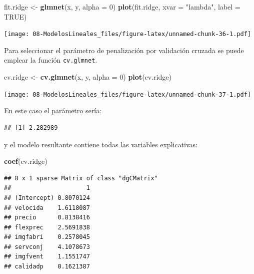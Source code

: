 \documentclass[]{book}
\newenvironment{Shaded}{\begin{snugshade}}{\end{snugshade}}
\newcommand{\KeywordTok}[1]{\textcolor[rgb]{0.13,0.29,0.53}{\textbf{#1}}}
\newcommand{\DataTypeTok}[1]{\textcolor[rgb]{0.13,0.29,0.53}{#1}}
\newcommand{\DecValTok}[1]{\textcolor[rgb]{0.00,0.00,0.81}{#1}}
\newcommand{\StringTok}[1]{\textcolor[rgb]{0.31,0.60,0.02}{#1}}
\newcommand{\OtherTok}[1]{\textcolor[rgb]{0.56,0.35,0.01}{#1}}
\newcommand{\OperatorTok}[1]{\textcolor[rgb]{0.81,0.36,0.00}{\textbf{#1}}}
\newcommand{\NormalTok}[1]{#1}
\begin{document}
\begin{Shaded}
\begin{Highlighting}[]
\NormalTok{fit.ridge <-}\StringTok{ }\KeywordTok{glmnet}\NormalTok{(x, y, }\DataTypeTok{alpha =} \DecValTok{0}\NormalTok{)}
\KeywordTok{plot}\NormalTok{(fit.ridge, }\DataTypeTok{xvar =} \StringTok{"lambda"}\NormalTok{, }\DataTypeTok{label =} \OtherTok{TRUE}\NormalTok{)}
\end{Highlighting}
\end{Shaded}

\texttt{[image: 08-ModelosLineales\_files/figure-latex/unnamed-chunk-36-1.pdf]}

Para seleccionar el parámetro de penalización por validación cruzada se
puede emplear la función \texttt{cv.glmnet}.

\begin{Shaded}
\begin{Highlighting}[]
\NormalTok{cv.ridge <-}\StringTok{ }\KeywordTok{cv.glmnet}\NormalTok{(x, y, }\DataTypeTok{alpha =} \DecValTok{0}\NormalTok{)}
\KeywordTok{plot}\NormalTok{(cv.ridge)}
\end{Highlighting}
\end{Shaded}

\texttt{[image: 08-ModelosLineales\_files/figure-latex/unnamed-chunk-37-1.pdf]}

En este caso el parámetro sería:

\begin{Shaded}
\end{Shaded}

\begin{verbatim}
## [1] 2.282989
\end{verbatim}

y el modelo resultante contiene todas las variables explicativas:

\begin{Shaded}
\begin{Highlighting}[]
\KeywordTok{coef}\NormalTok{(cv.ridge)}
\end{Highlighting}
\end{Shaded}

\begin{verbatim}
## 8 x 1 sparse Matrix of class "dgCMatrix"
##                     1
## (Intercept) 0.8070124
## velocida    1.6118087
## precio      0.8138416
## flexprec    2.5691838
## imgfabri    0.2578045
## servconj    4.1078673
## imgfvent    1.1551747
## calidadp    0.1621387
\end{verbatim}
\end{document}
